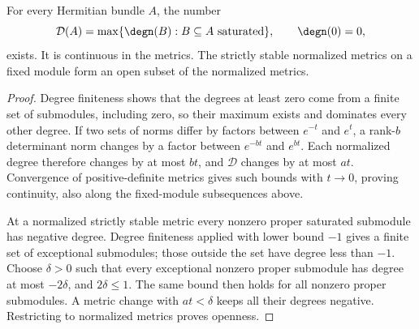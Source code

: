 \begin{lemma}
\label{lem:degree-maximum-continuity}
\leanok
{}
For every Hermitian bundle $A$, the number
\[
 \mathcal D(A)=\max\{\degn(B):B\subseteq A\text{ saturated}\},
 \qquad\degn(0)=0,
\]
exists. It is continuous in the metrics. The strictly stable normalized
metrics on a fixed module form an open subset of the normalized metrics.
\end{lemma}
\begin{proof}
Degree finiteness shows that the degrees at least zero come from a
finite set of submodules, including zero, so their maximum exists and
dominates every other degree. If two sets of norms differ by factors
between $e^{-t}$ and $e^t$, a rank-$b$ determinant norm changes by a
factor between $e^{-bt}$ and $e^{bt}$. Each normalized degree therefore
changes by at most $bt$, and $\mathcal D$ changes by at most $at$.
Convergence of positive-definite metrics gives such bounds with $t\to0$,
proving continuity, also along the fixed-module subsequences above.

At a normalized strictly stable metric every nonzero proper saturated
submodule has negative degree. Degree finiteness applied with lower
bound $-1$ gives a finite set of exceptional submodules; those outside
the set have degree less than $-1$. Choose $\delta>0$ such that every
exceptional nonzero proper submodule has degree at most $-2\delta$,
and $2\delta\leq1$. The same bound then holds for all nonzero proper
submodules. A metric change with $at<\delta$ keeps all their degrees
negative. Restricting to normalized metrics proves openness.
\end{proof}

